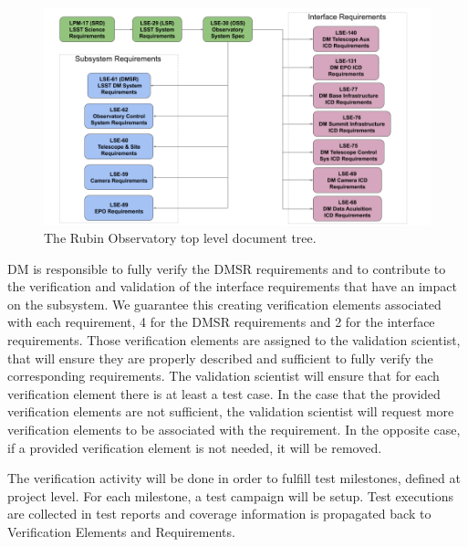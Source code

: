 \begin{figure}
\begin{center}
\includegraphics[width=\textwidth]{imgs/TopLevelDocTree.png}
 \caption{The Rubin Observatory top level document tree.}
 \label{fig:topdoctree}
\end{center}
\end{figure}

DM is responsible to fully verify the DMSR requirements and to contribute to the verification and validation of the interface requirements that have an impact on the subsystem.
We guarantee this creating verification elements associated with each requirement, 4 for the DMSR requirements and 2 for the interface requirements.
Those verification elements are assigned to the validation scientist, 
that will ensure they are properly described and sufficient to fully verify the corresponding requirements. 
The validation scientist will ensure that for each verification element there is at least a test case.
In the case that the provided verification elements are not sufficient, the validation scientist will request more verification elements to be associated with the requirement.
In the opposite case, if a provided verification element is not needed, it will be removed.

The verification activity will be done in order to fulfill test milestones, defined at project level.
For each milestone, a test campaign will be setup. 
Test executions are collected in test reports and coverage information is propagated back to Verification Elements and Requirements.


